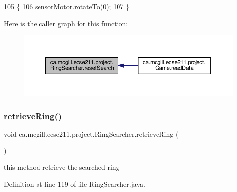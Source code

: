 \begin{DoxyCode}
105                             \{
106     sensorMotor.rotateTo(0);
107   \}
\end{DoxyCode}
Here is the caller graph for this function\+:
\nopagebreak
\begin{figure}[H]
\begin{center}
\leavevmode
\includegraphics[width=350pt]{classca_1_1mcgill_1_1ecse211_1_1project_1_1_ring_searcher_ad73c50b29163d91292de418101cce21e_icgraph}
\end{center}
\end{figure}
\mbox{\label{classca_1_1mcgill_1_1ecse211_1_1project_1_1_ring_searcher_afca3a0c746b07abb88881d926f4fe71f}} 
\subsubsection{\texorpdfstring{retrieve\+Ring()}{retrieveRing()}}
{\footnotesize\ttfamily void ca.\+mcgill.\+ecse211.\+project.\+Ring\+Searcher.\+retrieve\+Ring (\begin{DoxyParamCaption}{ }\end{DoxyParamCaption})}

this method retrieve the searched ring 

Definition at line 119 of file Ring\+Searcher.\+java.


